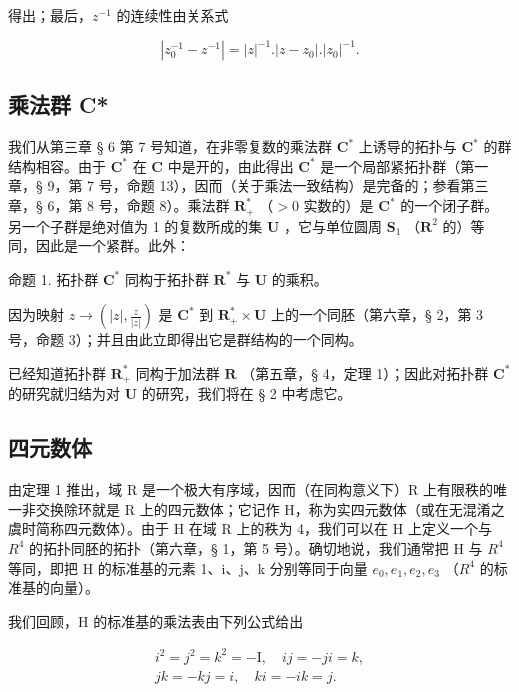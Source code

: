 得出；最后，\(z^{-1}\) 的连续性由关系式

\[
\left| z _ {0} ^ {- 1} - z ^ {- 1} \right| = | z | ^ {- 1}. \left| z - z _ {0} \right|. \left| z _ {0} \right| ^ {- 1}.
\]

\subsection{乘法群 C*}

我们从第三章 § 6 第 7 号知道，在非零复数的乘法群 \(\mathbf{C}^*\) 上诱导的拓扑与 \(\mathbf{C}^*\) 的群结构相容。由于 \(\mathbf{C}^*\) 在 \(\mathbf{C}\) 中是开的，由此得出 \(\mathbf{C}^*\) 是一个局部紧拓扑群（第一章，§ 9，第 7 号，命题 13），因而（关于乘法一致结构）是完备的；参看第三章，§ 6，第 8 号，命题 8）。乘法群 \(\mathbf{R}_+^*\) （\(>0\) 实数的）是 \(\mathbf{C}^*\) 的一个闭子群。另一个子群是绝对值为 1 的复数所成的集 \(\mathbf{U}\) ，它与单位圆周 \(\mathbf{S}_1\) （\(\mathbf{R}^2\) 的）等同，因此是一个紧群。此外：

命题 1. 拓扑群 \(\mathbf{C}^*\) 同构于拓扑群 \(\mathbf{R}^*\) 与 \(\mathbf{U}\) 的乘积。

因为映射 \(z \to \left( |z|, \frac{z}{|z|} \right)\) 是 \(\mathbf{C}^*\) 到 \(\mathbf{R}_+^* \times \mathbf{U}\) 上的一个同胚（第六章，§ 2，第 3 号，命题 3）；并且由此立即得出它是群结构的一个同构。

已经知道拓扑群 \(\mathbf{R}_{+}^{*}\) 同构于加法群 \(\mathbf{R}\) （第五章，§ 4，定理 1）；因此对拓扑群 \(\mathbf{C}^{*}\) 的研究就归结为对 \(\mathbf{U}\) 的研究，我们将在 § 2 中考虑它。

\subsection{四元数体}

由定理 1 推出，域 R 是一个极大有序域，因而（在同构意义下）R 上有限秩的唯一非交换除环就是 R 上的四元数体；它记作 H，称为实四元数体（或在无混淆之虞时简称四元数体）。由于 H 在域 R 上的秩为 4，我们可以在 H 上定义一个与 \(R^{4}\) 的拓扑同胚的拓扑（第六章，§ 1，第 5 号）。确切地说，我们通常把 H 与 \(R^{4}\) 等同，即把 H 的标准基的元素 1、i、j、k 分别等同于向量 \(e_{0}, e_{1}, e_{2}, e_{3}\) （\(R^{4}\) 的标准基的向量）。

我们回顾，H 的标准基的乘法表由下列公式给出

\[
\begin{array}{c} i ^ {2} = j ^ {2} = k ^ {2} = - \mathrm{I}, \quad i j = - j i = k, \\ j k = - k j = i, \quad k i = - i k = j. \end{array}
\]

